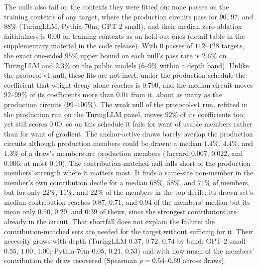 \documentclass[10pt]{article}
\begin{document}
The nulls also fail on the contexts they were fitted on: none passes on the training contexts of any target, where the production circuits pass for $90$, $97$, and $88\%$ (TuringLLM, Pythia-70m, GPT-2 small), and their median zero-ablation faithfulness is $0.00$ on training contexts as on held-out ones (detail table in the supplementary material in the code release).
With $0$ passes of $112$--$128$ targets, the exact one-sided $95\%$ upper bound on each null's pass rate is $2.6\%$ on TuringLLM and $2.3\%$ on the public models ($6$--$9\%$ within a depth band).
Unlike the protocol-v1 null, these fits are not inert: under the production schedule the coefficient that weight decay alone reaches is $0.790$, and the median circuit moves $92$--$99\%$ of its coefficients more than $0.01$ from it, about as many as the production circuits ($99$--$100\%$).
The weak null of the protocol-v1 run, refitted in the production run on the TuringLLM panel, moves $92\%$ of its coefficients too, yet still scores $0.00$, so on this schedule it fails for want of usable members rather than for want of gradient.
The anchor-active draws barely overlap the production circuits although production members could be drawn: a median $1.4\%$, $4.4\%$, and $1.3\%$ of a draw's members are production members (Jaccard $0.007$, $0.022$, and $0.006$; at most $0.10$).
The contribution-matched null falls short of the production members' strength where it matters most.
It finds a same-site non-member in the member's own contribution decile for a median $68\%$, $58\%$, and $71\%$ of members, but for only $22\%$, $11\%$, and $22\%$ of the members in the top decile; its drawn set's median contribution reaches $0.87$, $0.71$, and $0.94$ of the members' median but its mean only $0.50$, $0.29$, and $0.39$ of theirs, since the strongest contributors are already in the circuit.
That shortfall does not explain the failure: the contribution-matched sets are needed for the target without sufficing for it.
Their necessity grows with depth (TuringLLM $0.37$, $0.72$, $0.74$ by band; GPT-2 small $0.55$, $1.00$, $1.00$; Pythia-70m $0.05$, $0.21$, $0.53$) and with how much of the members' contribution the draw recovered (Spearman $\rho = 0.54$--$0.69$ across draws).
\end{document}
